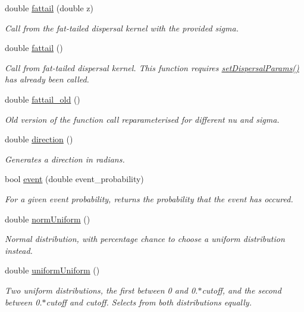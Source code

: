 \begin{DoxyCompactItemize}
double \hyperlink{class_n_rrand_a464101f3def678477f9156d0bd1aab54}{fattail} (double z)
\begin{DoxyCompactList}\small\item\em Call from the fat-\/tailed dispersal kernel with the provided sigma. \end{DoxyCompactList}\item 
double \hyperlink{class_n_rrand_a3ec8aae87ae486ddfb5ad481a7972c27}{fattail} ()
\begin{DoxyCompactList}\small\item\em Call from fat-\/tailed dispersal kernel. This function requires \hyperlink{class_n_rrand_a5679f458940de730f527772ca27db5ad}{set\+Dispersal\+Params()} has already been called. \end{DoxyCompactList}\item 
double \hyperlink{class_n_rrand_aab0ec97e2c0f74cf38cc7047356cae5c}{fattail\+\_\+old} ()
\begin{DoxyCompactList}\small\item\em Old version of the function call reparameterised for different nu and sigma. \end{DoxyCompactList}\item 
double \hyperlink{class_n_rrand_aef021289f62893215204589af450bf65}{direction} ()
\begin{DoxyCompactList}\small\item\em Generates a direction in radians. \end{DoxyCompactList}\item 
bool \hyperlink{class_n_rrand_a7c7a2dc1b3f14ebaaa0e6edd6c1d517a}{event} (double event\+\_\+probability)
\begin{DoxyCompactList}\small\item\em For a given event probability, returns the probability that the event has occured. \end{DoxyCompactList}\item 
double \hyperlink{class_n_rrand_ab18277b2f873878602e82672b272c9be}{norm\+Uniform} ()
\begin{DoxyCompactList}\small\item\em Normal distribution, with percentage chance to choose a uniform distribution instead. \end{DoxyCompactList}\item 
double \hyperlink{class_n_rrand_a799f55c57dc238f094a20e882e3abb51}{uniform\+Uniform} ()
\begin{DoxyCompactList}\small\item\em Two uniform distributions, the first between 0 and 0.$\ast$cutoff, and the second between 0.$\ast$cutoff and cutoff. Selects from both distributions equally. \end{DoxyCompactList}\item 

\end{DoxyCompactItemize}
